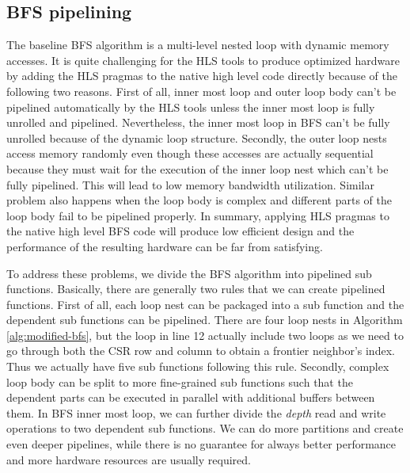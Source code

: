 \subsection{BFS pipelining}
The baseline BFS algorithm is a multi-level nested loop with 
dynamic memory accesses. It is quite challenging for the HLS 
tools to produce optimized hardware by adding the HLS pragmas to 
the native high level code directly because of the following two 
reasons. First of all, inner most loop and outer loop body can't be pipelined 
automatically by the HLS tools unless the inner most loop is fully 
unrolled and pipelined. Nevertheless, the inner most loop in BFS 
can't be fully unrolled because of the dynamic loop structure.  
Secondly, the outer loop nests access memory randomly even though 
these accesses are actually sequential because they must wait 
for the execution of the inner loop nest which can't 
be fully pipelined. This will lead to low 
memory bandwidth utilization. Similar problem also happens when the 
loop body is complex and different parts of the loop body fail to be 
pipelined properly. In summary, applying HLS pragmas to the native high level BFS code 
will produce low efficient design and the performance of the resulting hardware 
can be far from satisfying.  

To address these problems, we divide the BFS algorithm into pipelined 
sub functions. Basically, there are generally two rules that 
we can create pipelined functions. 
First of all, each loop nest can be packaged into a sub function 
and the dependent sub functions can be pipelined. There are four loop 
nests in Algorithm \ref{alg:modified-bfs}, 
but the loop in line 12 actually include two loops as we need to go through 
both the CSR row and column to obtain a frontier neighbor's index. Thus we 
actually have five sub functions following this rule. Secondly, complex loop body 
can be split to more fine-grained sub functions such that the dependent parts can 
be executed in parallel with additional buffers between them. 
In BFS inner most loop, we can further divide the \textit{depth} read and write 
operations to two dependent sub functions. We can 
do more partitions and create even deeper pipelines, while there is no 
guarantee for always better performance and more hardware resources 
are usually required.


